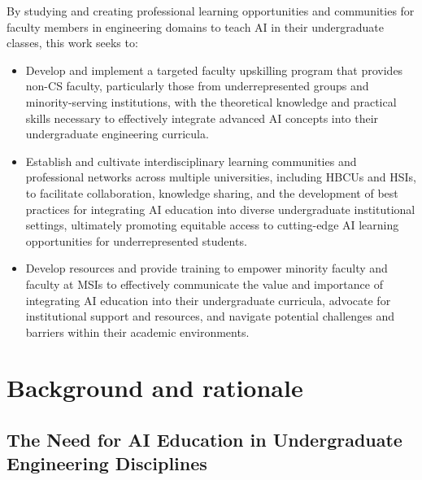 \documentclass[11pt]{article}
\begin{document}
\begin{tcolorbox}[colback=mycmykcolor, colframe=black, boxrule=1pt, coltext=black]
By studying and creating professional learning opportunities and communities for faculty members in engineering domains to teach AI in their undergraduate classes, this work seeks to: 
\begin{itemize}
    \item Develop and implement a targeted faculty upskilling program that provides non-CS faculty, particularly those from underrepresented groups and minority-serving institutions, with the theoretical knowledge and practical skills necessary to effectively integrate advanced AI concepts into their undergraduate engineering curricula.
    \item Establish and cultivate interdisciplinary learning communities and professional networks across multiple universities, including HBCUs and HSIs, to facilitate collaboration, knowledge sharing, and the development of best practices for integrating AI education into diverse undergraduate institutional settings, ultimately promoting equitable access to cutting-edge AI learning opportunities for underrepresented students.
    \item Develop resources and provide training to empower minority faculty and faculty at MSIs to effectively communicate the value and importance of integrating AI education into their undergraduate curricula, advocate for institutional support and resources, and navigate potential challenges and barriers within their academic environments.
\end{itemize}
\end{tcolorbox}

\section{Background and rationale}

\subsection{The Need for AI Education in Undergraduate Engineering Disciplines}
\end{document}
